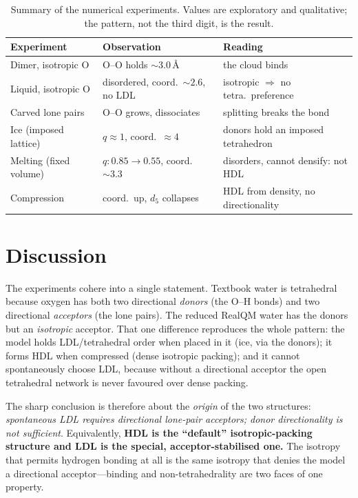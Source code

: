 \documentclass[11pt]{article}
\begin{document}
\begin{table}[t]
\centering
\begin{tabular}{lll}
\toprule
Experiment & Observation & Reading \\
\midrule
Dimer, isotropic O & O--O holds $\sim\!3.0$\,\AA & the cloud binds \\
Liquid, isotropic O & disordered, coord.\ $\sim\!2.6$, no LDL & isotropic $\Rightarrow$ no tetra.\ preference \\
Carved lone pairs & O--O grows, dissociates & splitting breaks the bond \\
Ice (imposed lattice) & $q\!\approx\!1$, coord.\ $\approx4$ & donors hold an imposed tetrahedron \\
Melting (fixed volume) & $q\!:0.85\!\to\!0.55$, coord.\ $\sim\!3.3$ & disorders, cannot densify: not HDL \\
Compression & coord.\ up, $d_5$ collapses & HDL from density, no directionality \\
\bottomrule
\end{tabular}
\caption{Summary of the numerical experiments. Values are exploratory and qualitative;
the pattern, not the third digit, is the result.}
\end{table}

\section{Discussion}

The experiments cohere into a single statement. Textbook water is tetrahedral because oxygen
has both two directional \emph{donors} (the O--H bonds) and two directional \emph{acceptors}
(the lone pairs). The reduced RealQM water has the donors but an \emph{isotropic} acceptor.
That one difference reproduces the whole pattern: the model holds LDL/tetrahedral order when
placed in it (ice, via the donors); it forms HDL when compressed (dense isotropic packing);
and it cannot spontaneously choose LDL, because without a directional acceptor the open
tetrahedral network is never favoured over dense packing.

The sharp conclusion is therefore about the \emph{origin} of the two structures:
\emph{spontaneous LDL requires directional lone-pair acceptors; donor directionality is not
sufficient}. Equivalently, \textbf{HDL is the ``default'' isotropic-packing structure and LDL
is the special, acceptor-stabilised one.} The isotropy that permits hydrogen bonding at all
is the same isotropy that denies the model a directional acceptor---binding and
non-tetrahedrality are two faces of one property.
\end{document}
